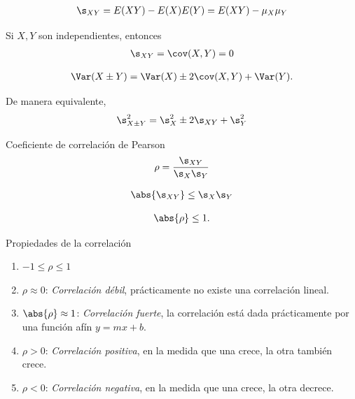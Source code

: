  \begin{align}
  \label{eq:0.3.50}
  \s_{XY}=E(XY)-E(X)E(Y)=E(XY)-\mu_{X}\mu_{Y}
 \end{align}


 Si $X,Y$ son independientes, entonces
 \begin{align}
  \label{eq:0.3.50}
  \s_{XY}=\cov(X,Y)=0
 \end{align}



 \begin{align}
  \label{eq:0.3.51}
  \Var(X\pm Y)=\Var(X)\pm2\cov(X,Y)+\Var(Y).
 \end{align}




 De manera equivalente,
 \begin{align}
  \label{eq:0.3.52}
  \s_{X\pm Y}^{2}=\s_{X}^{2} \pm 2\s_{XY} +\s_{Y}^{2}
 \end{align}


{Coeficiente de correlación de Pearson}
 \begin{align}
  \label{eq:0.3.54}
  \rho = \dfrac{\s_{XY}}{\s_{X}\s_{Y}}
 \end{align}



 \begin{teorema}
  \begin{align}
   \label{eq:0.3.53}
   \abs{\s_{XY}}\leq \s_{X}\s_{Y}
  \end{align}


 \begin{align}
  \abs{\rho}\leq 1.
 \end{align}
 \end{teorema}


{Propiedades de la correlación}

\begin{enumerate}
\item $-1 \leq \rho \leq 1$ 
 \item $\rho \approx 0$: \emph{Correlación débil}, prácticamente no existe una correlación lineal. 
 \item $\abs{\rho} \approx 1$:\emph{ Correlación fuerte}, la correlación está dada prácticamente por una función afín $y=mx+b$. 
 \item $\rho > 0$: \emph{Correlación positiva}, en la medida que una crece, la otra también crece. 
 \item $\rho < 0$: \emph{Correlación negativa}, en la medida que una crece, la otra decrece.
\end{enumerate}



